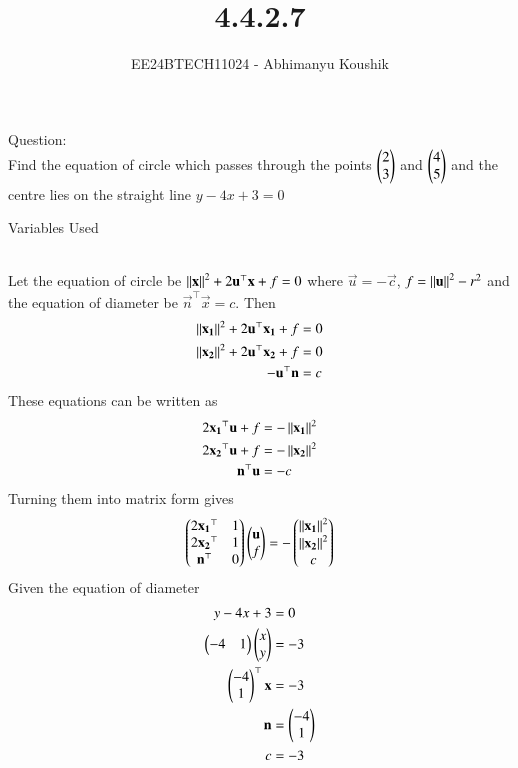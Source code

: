 \documentclass[journal]{IEEEtran}
\begin{document}

\vspace{3cm}

\title{4.4.2.7}
\author{EE24BTECH11024 - Abhimanyu Koushik}
{\let\newpage\relax\maketitle}
Question:\\
Find the equation of circle which passes through the points $\begin{pmatrix}2\\3\end{pmatrix}$ and $\begin{pmatrix}4\\5\end{pmatrix}$ and the centre lies on the straight line $y-4x+3=0$
\begin{table}[h!]    
  \centering
  
  \caption{Variables Used}
  \label{tab1-1.9-6}
\end{table}\\
Let the equation of circle be $\left\lVert\mathbf{x}\right\rVert^2+2\mathbf{u}^\top\mathbf{x}+f=0$ where $\vec{u}=-\vec{c}$, $f=\left\lVert\mathbf{u}\right\rVert^2-r^2$ and the equation of diameter be $\vec{n}^\top\vec{x}=c$. Then
\begin{align}
\left\lVert\mathbf{x_1}\right\rVert^2+2\mathbf{u}^\top\mathbf{x_1}+f&=0\\
\left\lVert\mathbf{x_2}\right\rVert^2+2\mathbf{u}^\top\mathbf{x_2}+f&=0\\
-\mathbf{u}^\top\mathbf{n}&=c
\end{align}
These equations can be written as 
\begin{align}
2\mathbf{x_1}^\top\mathbf{u}+f&=-\left\lVert\mathbf{x_1}\right\rVert^2\\
2\mathbf{x_2}^\top\mathbf{u}+f&=-\left\lVert\mathbf{x_2}\right\rVert^2\\
\mathbf{n}^\top\mathbf{u}&=-c
\end{align}
Turning them into matrix form gives
\begin{align}
\begin{pmatrix}2\mathbf{x_1}^\top & 1\\2\mathbf{x_2}^\top & 1\\ \mathbf{n}^\top & 0\end{pmatrix}\begin{pmatrix}\mathbf{u}\\f\end{pmatrix}&=-\begin{pmatrix}\left\lVert\mathbf{x_1}\right\rVert^2\\\left\lVert\mathbf{x_2}\right\rVert^2\\c\end{pmatrix}\\
\end{align}
Given the equation of diameter
\begin{align}
y-4x+3&=0\\
\begin{pmatrix}-4 & 1\end{pmatrix}\begin{pmatrix}x\\y\end{pmatrix}&=-3\\
\begin{pmatrix}-4\\1\end{pmatrix}^\top\mathbf{x}&=-3\\
\mathbf{n}&=\begin{pmatrix}-4\\1\end{pmatrix}\\
c&=-3
\end{align}
\end{document}
